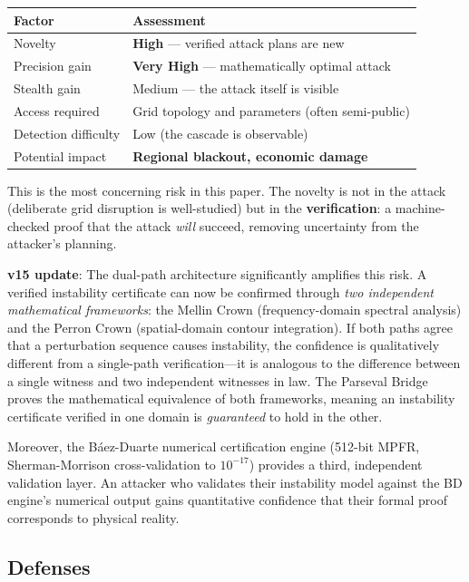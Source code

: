 \documentclass[11pt,a4paper]{article}
\begin{document}
\begin{center}
\begin{tabular}{@{}ll@{}}
\toprule
\textbf{Factor} & \textbf{Assessment} \\
\midrule
Novelty & \textbf{High} --- verified attack plans are new \\
Precision gain & \textbf{Very High} --- mathematically optimal attack \\
Stealth gain & Medium --- the attack itself is visible \\
Access required & Grid topology and parameters (often semi-public) \\
Detection difficulty & Low (the cascade is observable) \\
Potential impact & \textbf{Regional blackout, economic damage} \\
\bottomrule
\end{tabular}
\end{center}

This is the most concerning risk in this paper. The novelty is not
in the attack (deliberate grid disruption is well-studied) but in
the \textbf{verification}: a machine-checked proof that the attack
\emph{will} succeed, removing uncertainty from the attacker's
planning.

\textbf{v15 update}: The dual-path architecture significantly amplifies
this risk. A verified instability certificate can now be confirmed
through \emph{two independent mathematical frameworks}: the Mellin
Crown (frequency-domain spectral analysis) and the Perron Crown
(spatial-domain contour integration). If both paths agree that a
perturbation sequence causes instability, the confidence is
qualitatively different from a single-path verification---it is
analogous to the difference between a single witness and two
independent witnesses in law. The Parseval Bridge proves the
mathematical equivalence of both frameworks, meaning an instability
certificate verified in one domain is \emph{guaranteed} to hold in
the other.

Moreover, the B\'aez-Duarte numerical certification engine (512-bit
MPFR, Sherman-Morrison cross-validation to $10^{-17}$) provides a
third, independent validation layer. An attacker who validates their
instability model against the BD engine's numerical output gains
quantitative confidence that their formal proof corresponds to
physical reality.

\subsection{Defenses}
\end{document}
